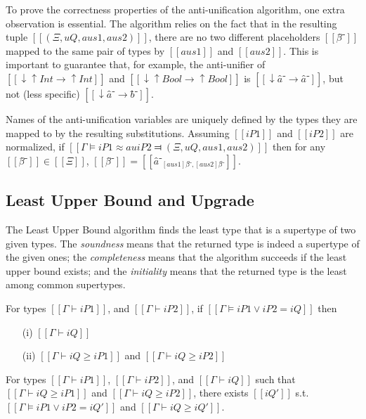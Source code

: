 To prove the correctness properties of the anti-unification algorithm,
one extra observation is essential. The algorithm relies on the fact that
in the resulting tuple $[[(Ξ, uQ, aus1, aus2)]]$,
there are no two different placeholders $[[β̂⁻]]$
mapped to the same pair of types by $[[aus1]]$ and $[[aus2]]$.
This is important to guarantee that, for example, 
the anti-unifier of $[[↓↑Int → ↑Int]]$ and 
$[[↓↑Bool → ↑Bool]]$ is $[[↓â⁻ → â⁻]]$, but not
(less specific) $[[↓â⁻ → b̂⁻]]$.

\begin{lemma*}
    Names of the anti-unification variables are uniquely defined by
    the types they are mapped to by the resulting substitutions. 
    Assuming $[[iP1]]$ and $[[iP2]]$ are normalized,
        if $[[Γ ⊨ iP1 ≈au iP2 ⫤ (Ξ, uQ, aus1, aus2)]]$
        then for any $[[β̂⁻]] \in [[Ξ]]$,
        $[[β̂⁻]] = [[â⁻_{[aus1]β̂⁻, [aus2]β̂⁻}]]$.
\end{lemma*}

\subsection{Least Upper Bound and Upgrade}

    The Least Upper Bound algorithm finds the least type that is a supertype of two given types.
    The \emph{soundness} means that the returned type is indeed a supertype of the given ones;
    the \emph{completeness} means that the algorithm succeeds if the least upper bound exists;
    and the \emph{initiality} means that the returned type is the least among common supertypes. 

    \begin{lemma*}
        For types $[[Γ ⊢ iP1]]$, and $[[Γ ⊢ iP2]]$,
        if $[[Γ ⊨ iP1 ∨ iP2 = iQ]]$ then
        \begin{enumerate}
            \item[(i)]  $[[Γ ⊢ iQ]]$
            \item[(ii)] $[[Γ ⊢ iQ ≥ iP1]]$ and $[[Γ ⊢ iQ ≥ iP2]]$
        \end{enumerate}
    \end{lemma*}


    \begin{lemma*}
        For types $[[Γ ⊢ iP1]]$, $[[Γ ⊢ iP2]]$, and $[[Γ ⊢ iQ]]$
        such that $[[Γ ⊢ iQ ≥ iP1]]$ and $[[Γ ⊢ iQ ≥ iP2]]$,
        there exists $[[iQ']]$ s.t. $[[Γ ⊨ iP1 ∨ iP2 = iQ']]$ 
        and $[[Γ ⊢ iQ ≥ iQ']]$.
    \end{lemma*}

